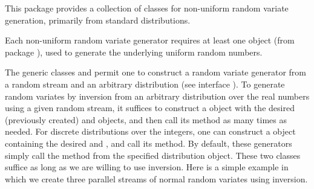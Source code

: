 
This package provides a collection of classes for non-uniform
random variate generation, primarily from standard distributions.

Each non-uniform random variate generator requires
at least one  object
(from package ), used to
generate the underlying uniform random numbers.
%

The generic classes
 and
permit one to construct a random variate generator from a random
stream and an arbitrary distribution
(see interface ).
To generate random variates by inversion from an arbitrary
distribution over the real numbers using a given random stream,
it suffices to construct a
 object
with the desired (previously created)
and  objects,
and then call its
 method
as many times as needed.
For discrete distributions over the integers, one can construct a
object containing the
desired 
and ,
and call its
method.
By default, these generators simply call the
method from the specified distribution object.
These two classes suffice as long as we are willing to use inversion.
Here is a simple example in which we create three parallel streams of
normal random variates using inversion.






